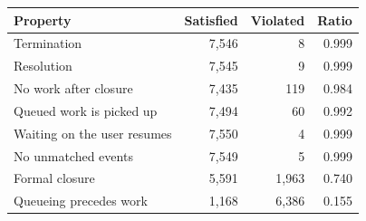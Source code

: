 \begin{tabular}{lrrr}
\toprule
Property & Satisfied & Violated & Ratio \\
\midrule
Termination & 7,546 & 8 & 0.999 \\
Resolution & 7,545 & 9 & 0.999 \\
No work after closure & 7,435 & 119 & 0.984 \\
Queued work is picked up & 7,494 & 60 & 0.992 \\
Waiting on the user resumes & 7,550 & 4 & 0.999 \\
No unmatched events & 7,549 & 5 & 0.999 \\
Formal closure & 5,591 & 1,963 & 0.740 \\
Queueing precedes work & 1,168 & 6,386 & 0.155 \\
\bottomrule
\end{tabular}
